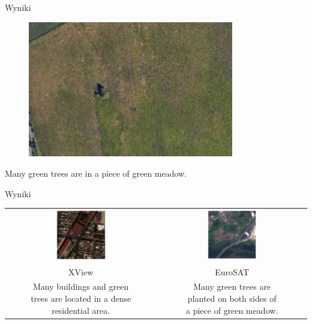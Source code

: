 \documentclass{beamer}
\begin{document}
\begin{frame}{Wyniki}
  \begin{figure}
    \centering
    \includegraphics[width=0.8\textwidth]{../img/tree_in_a_field.png}
  \end{figure}
  Many green trees are in a piece of green meadow.
\end{frame}

\begin{frame}{Wyniki}
  \begin{table}[h]
    \centering
    \small
    \begin{tabular}{cc}
      \includegraphics[width=0.35\textwidth]{../img/xview_2.png} & \includegraphics[width=0.35\textwidth]{../img/eurosat_2.png}  \\
      XView &  EuroSAT \\ [1em]
      \makecell{Many buildings and green \\trees are located in a dense\\ residential area.} & \makecell{Many green trees are\\ planted on both sides of\\ a piece of green meadow.}
    \end{tabular}
  \end{table}
\end{frame}
\end{document}
